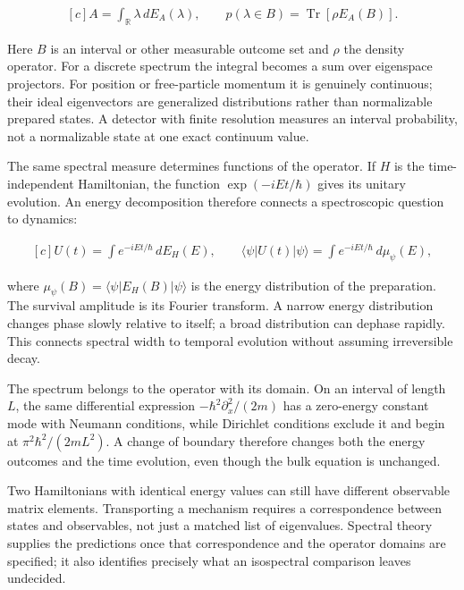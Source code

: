 \documentclass[11pt,oneside]{book}
\newenvironment{centeredalign}{\[\begin{gathered}[c]}{\end{gathered}\]}
\begin{document}
\begin{centeredalign}
A=\int_{\mathbb R}\lambda\,dE_A(\lambda),\qquad
p(\lambda\in B)=\operatorname{Tr}[\rho E_A(B)].
\end{centeredalign}

Here \(B\) is an interval or other measurable outcome set and \(\rho\) the density operator. For a discrete spectrum the integral becomes a sum over eigenspace projectors. For position or free-particle momentum it is genuinely continuous; their ideal eigenvectors are generalized distributions rather than normalizable prepared states. A detector with finite resolution measures an interval probability, not a normalizable state at one exact continuum value.

The same spectral measure determines functions of the operator. If \(H\) is the time-independent Hamiltonian, the function \(\exp(-iEt/\hbar)\) gives its unitary evolution. An energy decomposition therefore connects a spectroscopic question to dynamics:

\begin{centeredalign}
U(t)=\int e^{-iEt/\hbar}\,dE_H(E),\qquad
\langle\psi|U(t)|\psi\rangle=\int e^{-iEt/\hbar}\,d\mu_\psi(E),
\end{centeredalign}

where \(\mu_\psi(B)=\langle\psi|E_H(B)|\psi\rangle\) is the energy distribution of the preparation. The survival amplitude is its Fourier transform. A narrow energy distribution changes phase slowly relative to itself; a broad distribution can dephase rapidly. This connects spectral width to temporal evolution without assuming irreversible decay.

The spectrum belongs to the operator with its domain. On an interval of length \(L\), the same differential expression \(-\hbar^2\partial_x^2/(2m)\) has a zero-energy constant mode with Neumann conditions, while Dirichlet conditions exclude it and begin at \(\pi^2\hbar^2/(2mL^2)\). A change of boundary therefore changes both the energy outcomes and the time evolution, even though the bulk equation is unchanged.

Two Hamiltonians with identical energy values can still have different observable matrix elements. Transporting a mechanism requires a correspondence between states and observables, not just a matched list of eigenvalues. Spectral theory supplies the predictions once that correspondence and the operator domains are specified; it also identifies precisely what an isospectral comparison leaves undecided.
\end{document}
